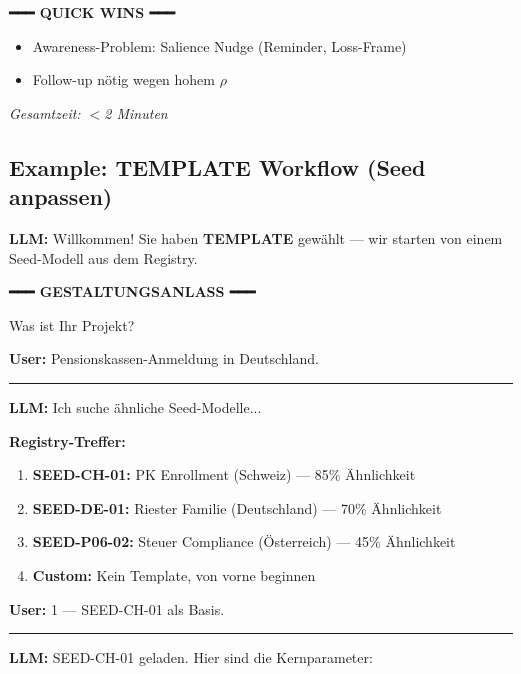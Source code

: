\begin{tcolorbox}[colback=green!5!white, colframe=green!75!black,
    title=Example: SCHNELL Model Design (3 Questions), breakable]
{{\textbf{━━━ QUICK WINS ━━━}
\begin{itemize}[nosep]
\item Awareness-Problem: Salience Nudge (Reminder, Loss-Frame)
\item Follow-up nötig wegen hohem $\rho$
\end{itemize}
}}

\vspace{0.3em}
\textit{Gesamtzeit: $<$2 Minuten}
\end{tcolorbox}

\subsection{Example: TEMPLATE Workflow (Seed anpassen)}

\begin{tcolorbox}[colback=orange!5!white, colframe=orange!75!black,
    title=Example: TEMPLATE Model Design (Start from Seed), breakable]
\small
\textbf{LLM:} Willkommen! Sie haben \textbf{TEMPLATE} gewählt --- wir starten
von einem Seed-Modell aus dem Registry.

\vspace{0.3em}
\textbf{━━━ GESTALTUNGSANLASS ━━━}
\vspace{0.3em}

Was ist Ihr Projekt?

\textbf{User:} Pensionskassen-Anmeldung in Deutschland.

\hrule
\vspace{0.3em}

\textbf{LLM:} Ich suche ähnliche Seed-Modelle...

\textbf{Registry-Treffer:}
\begin{enumerate}
\item \textbf{SEED-CH-01:} PK Enrollment (Schweiz) --- 85\% Ähnlichkeit
\item \textbf{SEED-DE-01:} Riester Familie (Deutschland) --- 70\% Ähnlichkeit
\item \textbf{SEED-P06-02:} Steuer Compliance (Österreich) --- 45\% Ähnlichkeit
\item \textbf{Custom:} Kein Template, von vorne beginnen
\end{enumerate}

\textbf{User:} 1 --- SEED-CH-01 als Basis.

\hrule
\vspace{0.3em}

\textbf{LLM:} SEED-CH-01 geladen. Hier sind die Kernparameter:


\end{tcolorbox}
